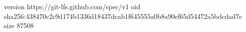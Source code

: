 version https://git-lfs.github.com/spec/v1
oid sha256:438470c2c9d174b1336d18437dcab1f645555a0b8a90ef65d54472a5bdcdad7c
size 87508
